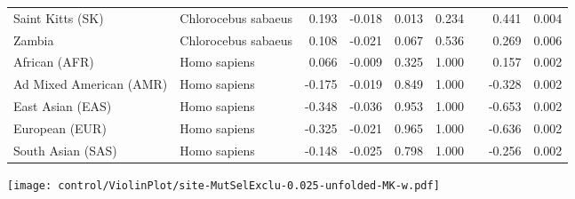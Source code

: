 \begin{center}
\begin{adjustbox}{width = 1\textwidth}
\begin{tabular}{|l|l|r|r|r|r|r|r|}
               Saint Kitts (SK) &  Chlorocebus sabaeus &                                              0.193 &                                             -0.018 &            0.013 &                         0.234~~ &                                              0.441 &              0.004 \\
                         Zambia &  Chlorocebus sabaeus &                                              0.108 &                                             -0.021 &            0.067 &                         0.536~~ &                                              0.269 &              0.006 \\
                  African (AFR) &         Homo sapiens &                                              0.066 &                                             -0.009 &            0.325 &                         1.000~~ &                                              0.157 &              0.002 \\
        Ad Mixed American (AMR) &         Homo sapiens &                                             -0.175 &                                             -0.019 &            0.849 &                         1.000~~ &                                             -0.328 &              0.002 \\
               East Asian (EAS) &         Homo sapiens &                                             -0.348 &                                             -0.036 &            0.953 &                         1.000~~ &                                             -0.653 &              0.002 \\
                 European (EUR) &         Homo sapiens &                                             -0.325 &                                             -0.021 &            0.965 &                         1.000~~ &                                             -0.636 &              0.002 \\
              South Asian (SAS) &         Homo sapiens &                                             -0.148 &                                             -0.025 &            0.798 &                         1.000~~ &                                             -0.256 &              0.002 \\
\bottomrule
\end{tabular}
\end{adjustbox}
\newpage
\texttt{[image: control/ViolinPlot/site-MutSelExclu-0.025-unfolded-MK-w.pdf]} 
\begin{adjustbox}{width = 1\textwidth}

\end{adjustbox}
\end{center}
